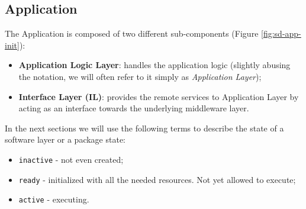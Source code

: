 \subsection{Application}
The Application is composed of two different sub-components (Figure
\ref{fig:sd-app-init}):

\begin{itemize}
  \item \textbf{Application Logic Layer}: handles the application logic
    (slightly abusing the notation, we will often refer to it simply as
    \textit{Application Layer});
  \item \textbf{Interface Layer (IL)}: provides the remote services to Application
    Layer by acting as an interface towards the underlying middleware layer.
\end{itemize}

In the next sections we will use the following terms to describe the state of a
software layer or a package state:
\begin{itemize}
	\item \verb|inactive| - not even created;
	\item \verb|ready| - initialized with all the needed resources. Not yet
	allowed to execute;
	\item \verb|active| - executing.
\end{itemize}







